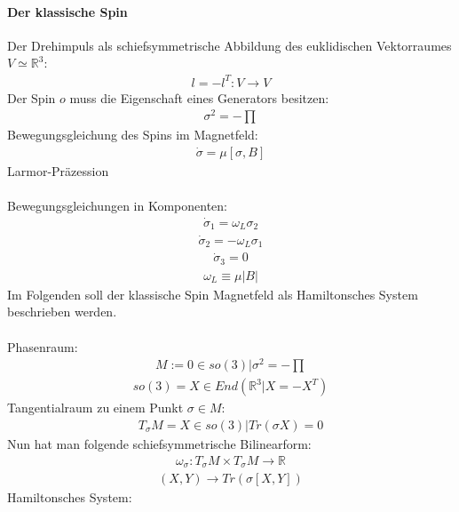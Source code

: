 \documentclass[10pt,a4paper]{article}
\begin{document}
\paragraph{Der klassische Spin} $\,$\\
Der Drehimpuls als schiefsymmetrische Abbildung des euklidischen Vektorraumes $ V \simeq \mathbb{R}^3$:
\begin{align}
l=-l^T : V \longrightarrow V 
\end{align}
Der Spin $o$ muss die Eigenschaft eines Generators besitzen:
\begin{align}
\sigma^2=-\prod
\end{align}
Bewegungsgleichung des Spins im Magnetfeld:
\begin{align}
\dot{\sigma}= \mu [\sigma,B]
\end{align}
Larmor-Präzession \\
\\
Bewegungsgleichungen in Komponenten:
\begin{align}
\dot{\sigma}_1= \omega_L \sigma_2
\end{align}
\begin{align}
\dot{\sigma}_2= -\omega_L \sigma_1
\end{align}
\begin{align}
\dot{\sigma}_3=0
\end{align}
\begin{align}
\omega_L \equiv \mu \vert B \vert
\end{align}
Im Folgenden soll der klassische Spin Magnetfeld als Hamiltonsches System beschrieben werden.\\
\\
Phasenraum:
\begin{align}
M := {0 \in so(3)\vert \sigma^2=-\prod}
\end{align}
\begin{align}
so(3) = {X \in End(\mathbb{R}^3 \vert X=-X^T)}
\end{align}
Tangentialraum zu einem Punkt $ \sigma \in M$:
\begin{align}
T_{\sigma}M={X \in so(3) \vert Tr(\sigma X)=0}
\end{align}
Nun hat man folgende schiefsymmetrische Bilinearform:
\begin{align}
\omega_{\sigma} : T_{\sigma} M \times T_{\sigma} M \longrightarrow \mathbb{R}
\end{align}
\begin{align}
(X,Y) \longrightarrow Tr(\sigma [X,Y])
\end{align}
Hamiltonsches System:
\end{document}
